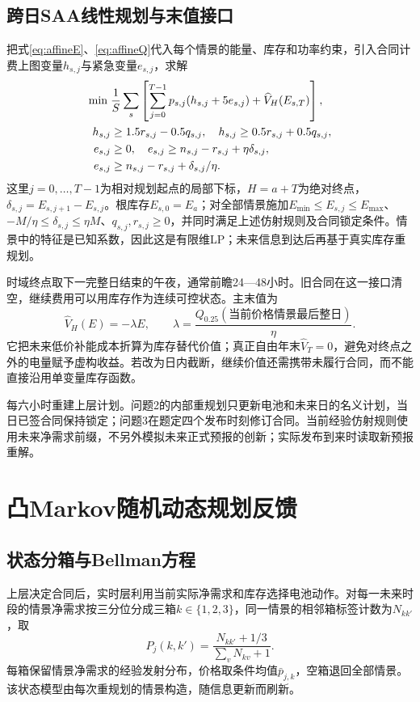 \documentclass[UTF8,a4paper,zihao=-4,fontset=mac]{ctexart}
\begin{document}
\subsection{跨日SAA线性规划与末值接口}
把式\eqref{eq:affineE}、\eqref{eq:affineQ}代入每个情景的能量、库存和功率约束，引入合同计费上图变量$h_{s,j}$与紧急变量$e_{s,j}$，求解
\begin{align}
 \min\;&\frac1S\sum_s\left[\sum_{j=0}^{T-1}p_{s,j}(h_{s,j}+5e_{s,j})+\widehat V_H(E_{s,T})\right],\label{eq:upper}\\
 h_{s,j}&\ge1.5r_{s,j}-0.5q_{s,j},\quad h_{s,j}\ge0.5r_{s,j}+0.5q_{s,j},\notag\\
 e_{s,j}&\ge0,\quad e_{s,j}\ge n_{s,j}-r_{s,j}+\eta\delta_{s,j},\notag\\
 e_{s,j}&\ge n_{s,j}-r_{s,j}+\delta_{s,j}/\eta.\notag
\end{align}
这里$j=0,\ldots,T-1$为相对规划起点的局部下标，$H=a+T$为绝对终点，$\delta_{s,j}=E_{s,j+1}-E_{s,j}$。根库存$E_{s,0}=E_a$；对全部情景施加$E_{\min}\le E_{s,j}\le E_{\max}$、$-M/\eta\le\delta_{s,j}\le\eta M$、$q_{s,j},r_{s,j}\ge0$，并同时满足上述仿射规则及合同锁定条件。情景中的特征是已知系数，因此这是有限维LP；未来信息到达后再基于真实库存重规划。

时域终点取下一完整日结束的午夜，通常前瞻24—48小时。旧合同在这一接口清空，继续费用可以用库存作为连续可控状态。主末值为
\begin{equation}
 \widehat V_H(E)=-\lambda E,\qquad
 \lambda=\frac{Q_{0.25}(\text{当前价格情景最后整日})}{\eta}.\label{eq:tail}
\end{equation}
它把未来低价补能成本折算为库存替代价值；真正自由年末$\widehat V_T=0$，避免对终点之外的电量赋予虚构收益。若改为日内截断，继续价值还需携带未履行合同，而不能直接沿用单变量库存函数。

每六小时重建上层计划。问题2的内部重规划只更新电池和未来日的名义计划，当日已签合同保持锁定；问题3在题定四个发布时刻修订合同。当前经验仿射规则使用未来净需求前缀，不另外模拟未来正式预报的创新；实际发布到来时读取新预报重解。

\section{凸Markov随机动态规划反馈}
\subsection{状态分箱与Bellman方程}
上层决定合同后，实时层利用当前实际净需求和库存选择电池动作。对每一未来时段的情景净需求按三分位分成三箱$k\in\{1,2,3\}$，同一情景的相邻箱标签计数为$N_{kk'}$，取
\begin{equation}
 P_j(k,k')=\frac{N_{kk'}+1/3}{\sum_vN_{kv}+1}.
\end{equation}
每箱保留情景净需求的经验发射分布，价格取条件均值$\bar p_{j,k}$，空箱退回全部情景。该状态模型由每次重规划的情景构造，随信息更新而刷新。
\end{document}
